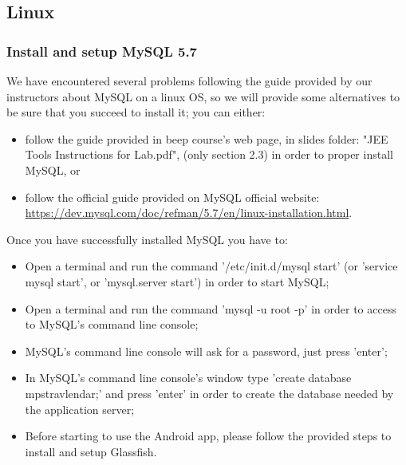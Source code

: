 \subsection{Linux}
\label{subsect:Linux}

\subsubsection{Install and setup MySQL 5.7}
We have encountered several problems following the guide provided by our instructors about MySQL on a linux OS, so we will provide some alternatives to be sure that you succeed to install it; you can either:
\begin{itemize}
	\item follow the guide provided in beep course's web page, in slides folder: "JEE Tools Instructions for Lab.pdf", (only section 2.3) in order to proper install MySQL, or
	\item follow the official guide provided on MySQL official website: \\ \href{https://dev.mysql.com/doc/refman/5.7/en/linux-installation.html}{\color{blue}https://dev.mysql.com/doc/refman/5.7/en/linux-installation.html}.
\end{itemize} 
Once you have successfully installed MySQL you have to:
\begin{itemize}
	\item Open a terminal and run the command '/etc/init.d/mysql start' (or 'service mysql start', or 'mysql.server start') in order to start MySQL;
	\item Open a terminal and run the command 'mysql -u root -p' in order to access to MySQL's command line console;
	\item MySQL's command line console will ask for a password, just press 'enter';
	\item In MySQL's command line console's window type 'create database mps\textunderscore travlendar;' and press 'enter' in order to create the database needed by the application server;
	\item Before starting to use the Android app, please follow the provided steps to install and setup Glassfish.
\end{itemize}

